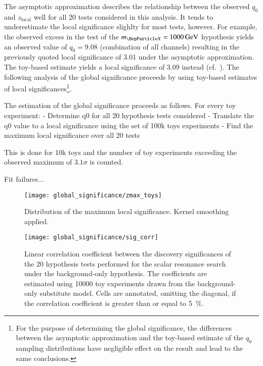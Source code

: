 The asymptotic approximation describes the relationship between the
observed $q_0$ and $z_{\text{local}}$ well for all 20 tests considered
in this analysis. It tends to underestimate the local significance
slighlty for most tests, however. For example, the observed excess in
the test of the $\mX = \SI{1000}{\GeV}$ hypothesis yields an observed
value of $q_0 = \num{9.08}$ (combination of all channels) resulting in
the previously quoted local significance of \num{3.01} under the
asymptotic approximation. The toy-based estimate yields a local
significance of \num{3.09} instead
(cf.~). The following analysis of the
global significance proceeds by using toy-based estimates of local
significances\footnote{For the purpose of determining the global
  significance, the differences between the asymptotic approximation
  and the toy-based estimate of the $q_0$ sampling distributions have
  negligible effect on the result and lead to the same conclusions.}.


The estimation of the global significance proceeds as follows. For
every toy experiment:
- Determine q0 for all 20 hypothesis tests considered
- Translate the q0 value to a local significance using the set of 100k toys experiments
- Find the maximum local significance over all 20 tests

This is done for 10k toys and the number of toy experiments exceeding
the observed maximum of $3.1\sigma$ is counted.


Fit failures...

\begin{figure}[htbp]
  \centering

  \texttt{[image: global\_significance/zmax\_toys]}

  \caption{Distribution of the maximum local significance. Kernel
    smoothing applied.}%
  \label{fig:zmax_toys}
\end{figure}

\begin{figure}[htbp]
  \centering

  \texttt{[image: global\_significance/sig\_corr]}

  \caption{Linear correlation coefficient between the discovery
    significances of the 20 hypothesis tests performed for the scalar
    resonance search under the background-only hypothesis. The
    coefficients are estimated using 10000 toy experiments drawn from
    the background-only substitute model. Cells are annotated,
    omitting the diagonal, if the correlation coefficient is greater
    than or equal to \SI{5}{\percent}.}%
  \label{fig:corr_sig}
\end{figure}


